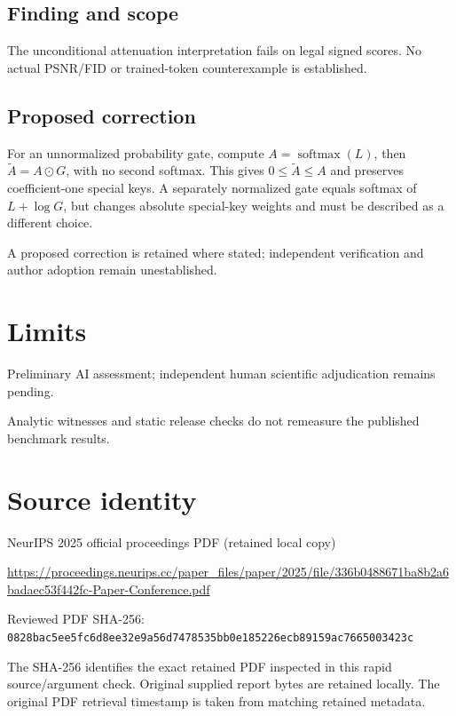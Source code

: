 \documentclass[11pt]{article}
\begin{document}
\subsection*{Finding and scope}

The unconditional attenuation interpretation fails on legal signed scores. No actual PSNR/FID or trained-token counterexample is established.

\subsection*{Proposed correction}

For an unnormalized probability gate, compute \(A=\operatorname{softmax}(L)\), then \(\widetilde A=A\odot G\), with no second softmax. This gives \(0\le\widetilde A\le A\) and preserves coefficient-one special keys. A separately normalized gate equals softmax of \(L+\log G\), but changes absolute special-key weights and must be described as a different choice.

A proposed correction is retained where stated; independent verification and author adoption remain unestablished.

\section*{Limits}

Preliminary AI assessment; independent human scientific adjudication remains pending.\par

Analytic witnesses and static release checks do not remeasure the published benchmark results.\par

\section*{Source identity}

NeurIPS 2025 official proceedings PDF (retained local copy)

\url{https://proceedings.neurips.cc/paper_files/paper/2025/file/336b0488671ba8b2a6badaec53f442fc-Paper-Conference.pdf}

Reviewed PDF SHA-256: \nolinkurl{0828bac5ee5fc6d8ee32e9a56d7478535bb0e185226ecb89159ac7665003423c}

The SHA-256 identifies the exact retained PDF inspected in this rapid source/argument check. Original supplied report bytes are retained locally. The original PDF retrieval timestamp is taken from matching retained metadata.
\end{document}
